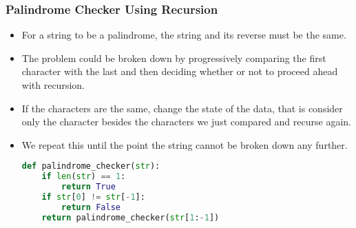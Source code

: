 \documentclass{beamer}
\begin{document}
\begin{frame}[fragile]
\frametitle{Palindrome Checker Using Recursion}
\begin{itemize}
\item For a string to be a palindrome, the string and its reverse must be the same.
\item The problem could be broken down by progressively comparing the first character with the last and then deciding whether or not to proceed ahead with recursion.
\item If the characters are the same, change the state of the data, that is consider only the character besides the characters we just compared and recurse again.
\item We repeat this until the point the string cannot be broken down any further. 
\begin{lstlisting}[language=Python]
def palindrome_checker(str):
    if len(str) == 1: 
        return True
    if str[0] != str[-1]: 
        return False
    return palindrome_checker(str[1:-1])
\end{lstlisting}
\end{itemize}
\end{frame}
\end{document}
